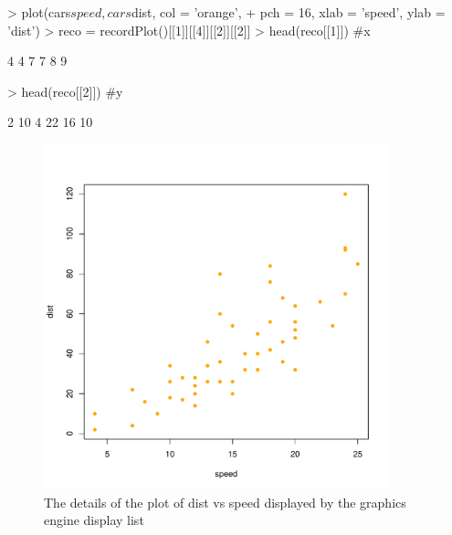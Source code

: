 \documentclass[paper=a4, fontsize=11pt]{report}
\begin{document}
\begin{Schunk}
\begin{Sinput}
> plot(cars$speed, cars$dist, col = 'orange', 
+       pch = 16, xlab = 'speed', ylab = 'dist')
> reco = recordPlot()[[1]][[4]][[2]][[2]]
> head(reco[[1]]) #x
\end{Sinput}
\begin{Soutput}
[1] 4 4 7 7 8 9
\end{Soutput}
\begin{Sinput}
> head(reco[[2]]) #y
\end{Sinput}
\begin{Soutput}
[1]  2 10  4 22 16 10
\end{Soutput}
\end{Schunk}


\begin{figure}[h]
\begin{center}
  \includegraphics[height = 10cm, width = 10cm]{figure/report_3.pdf}
  \caption{The details of the plot of dist vs speed displayed by the graphics engine display list}
  	\label{figure4}
\end{center}
\end{figure}
\end{document}

